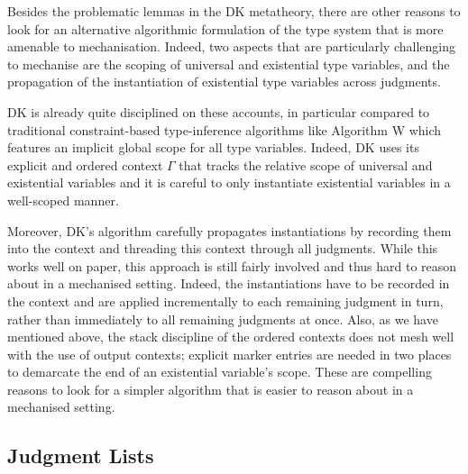 Besides the problematic lemmas in the DK metatheory, there are other reasons to
look for an alternative algorithmic formulation of the type system that is more
amenable to mechanisation. Indeed, two aspects that are particularly
challenging to mechanise are the scoping of universal and existential type
variables, and the propagation of the instantiation of existential type
variables across judgments. 

DK is already quite disciplined on these accounts, in particular compared to
traditional constraint-based type-inference algorithms like Algorithm W which
features an implicit global scope for all type variables. Indeed, DK uses its
explicit and ordered context $\Gamma$ that tracks the relative scope of universal and
existential variables and it is careful to only instantiate existential
variables in a well-scoped manner.

Moreover, DK's algorithm carefully propagates instantiations by recording them
into the context and threading this context through all judgments. 
While this works well on paper, this approach is still fairly involved and thus
hard to reason about in a mechanised setting. Indeed, the instantiations have
to be recorded in the context and are applied incrementally to each remaining
judgment in turn, rather than immediately to all remaining judgments at once.
Also, as we have mentioned above, the stack discipline of the ordered contexts
does not mesh well with the use of output contexts; explicit marker entries are
needed in two places to demarcate the end of an existential variable's scope.
These are compelling reasons to look for a simpler algorithm that is easier to
reason about in a mechanised setting.


\subsection{Judgment Lists}

